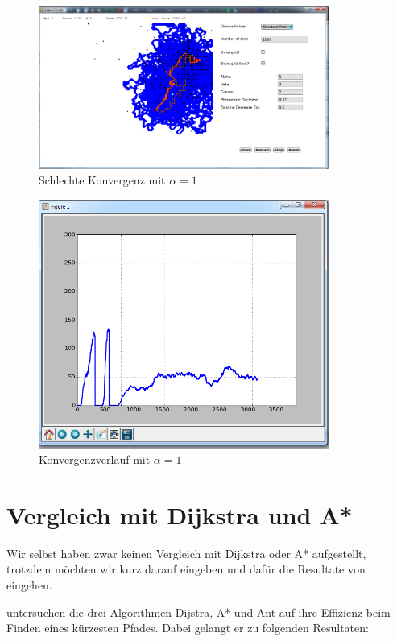 \begin{figure}[h]
  \centering
	\includegraphics [width=0.85\textwidth]{images/screenshots/bad1.png} 
	\caption{Schlechte Konvergenz mit $\alpha = 1$}
\end{figure}

\begin{figure}[h]
  \centering
	\includegraphics [width=0.85\textwidth]{images/screenshots/bad1_chart.png} 
	\caption{Konvergenzverlauf mit $\alpha = 1$}
\end{figure}

\section{Vergleich mit Dijkstra und A*}

Wir selbst haben zwar keinen Vergleich mit Dijkstra oder A* aufgestellt, trotzdem möchten wir kurz darauf eingeben und dafür die Resultate von \citet*{leo-perf} eingehen.

\citeauthor*{leo-perf} untersuchen die drei Algorithmen Dijstra, A* und Ant auf ihre Effizienz beim Finden eines kürzesten Pfades. Dabei gelangt er zu folgenden Resultaten:

